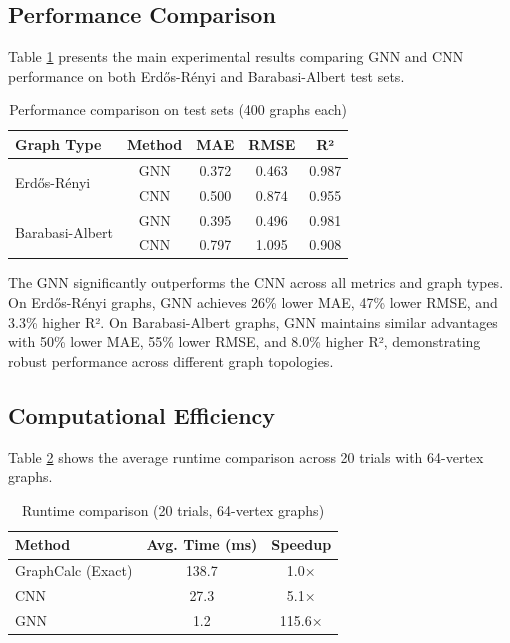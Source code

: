\documentclass{article}
\begin{document}
\subsection{Performance Comparison}

Table \ref{tab:results} presents the main experimental results comparing GNN and CNN performance on both Erdős-Rényi and Barabasi-Albert test sets.

\begin{table}[h]
  \caption{Performance comparison on test sets (400 graphs each)}
  \label{tab:results}
  \centering
  \begin{tabular}{lcccc}
    \toprule
    Graph Type & Method & MAE & RMSE & R² \\
    \midrule
    \multirow{2}{*}{Erdős-Rényi} & GNN & 0.372 & 0.463 & 0.987 \\
    & CNN & 0.500 & 0.874 & 0.955 \\
    \midrule
    \multirow{2}{*}{Barabasi-Albert} & GNN & 0.395 & 0.496 & 0.981 \\
    & CNN & 0.797 & 1.095 & 0.908 \\
    \bottomrule
  \end{tabular}
\end{table}

The GNN significantly outperforms the CNN across all metrics and graph types. On Erdős-Rényi graphs, GNN achieves 26\% lower MAE, 47\% lower RMSE, and 3.3\% higher R². On Barabasi-Albert graphs, GNN maintains similar advantages with 50\% lower MAE, 55\% lower RMSE, and 8.0\% higher R², demonstrating robust performance across different graph topologies.

\subsection{Computational Efficiency}

Table \ref{tab:runtime} shows the average runtime comparison across 20 trials with 64-vertex graphs.

\begin{table}[h]
  \caption{Runtime comparison (20 trials, 64-vertex graphs)}
  \label{tab:runtime}
  \centering
  \begin{tabular}{lcc}
    \toprule
    Method & Avg. Time (ms) & Speedup \\
    \midrule
    GraphCalc (Exact) & 138.7 & 1.0× \\
    CNN & 27.3 & 5.1× \\
    GNN & 1.2 & 115.6× \\
    \bottomrule
  \end{tabular}
\end{table}
\end{document}
